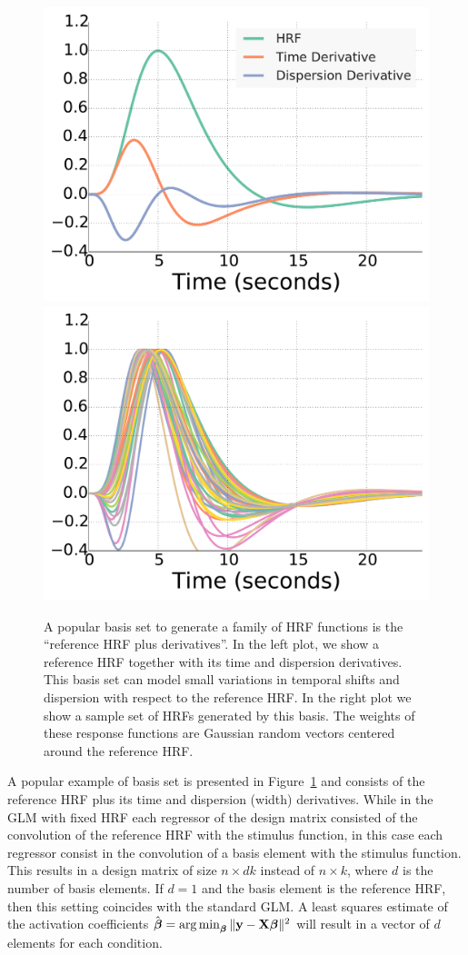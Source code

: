 \begin{figure}
\includegraphics[width=.5\linewidth]{figures/chapter_1/canonical_hrf_basis.pdf}
\includegraphics[width=.5\linewidth]{figures/chapter_1/canonical_hrf_generated.pdf}
\caption{A popular basis set to generate a family of HRF functions is the ``reference HRF plus derivatives''. In the left plot, we show a reference HRF together with its time and dispersion derivatives. This basis set can model small variations in temporal shifts and dispersion with respect to the reference HRF. In the right plot we show a sample set of HRFs generated by this basis. The weights of these response functions are Gaussian random vectors centered around the reference HRF.}\label{fig:hrf_basis} 
\end{figure}

A popular example of basis set is presented in Figure~\ref{fig:hrf_basis} and consists of the reference HRF plus its time and dispersion (width) derivatives. While in the GLM with fixed HRF each regressor of the design matrix consisted of the convolution of the reference HRF with the stimulus function, in this case each regressor consist in the convolution of a basis element with the stimulus function. This results in a  design matrix of size $n \times d k$ instead of $n \times k$, where $d$ is the number of basis elements. If $d=1$ and the basis element is the reference HRF, then this setting coincides with the standard GLM. A least squares estimate of the activation coefficients $\hat{{\boldsymbol \beta}} = \operatorname*{arg\,min}_{{\boldsymbol \beta}}\|\mathbf{y} - \mathbf{X}{\boldsymbol \beta} \|^2$ will result in a vector of $d$ elements for each condition. 


